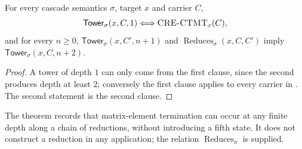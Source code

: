 \begin{theorem}\label{thm:ctmt-recursion}
For every cascade semantics \(\sigma\), target \(x\) and carrier \(C\),
\[
  \mathsf{Tower}_{\sigma}(x,C,1)\Longleftrightarrow\mbox{\textup{\textsc{CRE-CTMT}}}_{x}(C),
\]
and for every \(n\ge0\), \(\mathsf{Tower}_{\sigma}(x,C',n+1)\) and
\(\operatorname{Reduces}_{\sigma}(x,C,C')\) imply
\(\mathsf{Tower}_{\sigma}(x,C,n+2)\).
\end{theorem}

\begin{proof}
A tower of depth \(1\) can only come from the first clause, since the
second produces depth at least \(2\); conversely the first clause
applies to every carrier in \CRECTMT.  The second statement is the
second clause.
\end{proof}

The theorem records that matrix-element termination can occur at any
finite depth along a chain of reductions, without introducing a fifth
state.  It does not construct a reduction in any application; the
relation \(\operatorname{Reduces}_{\sigma}\) is supplied.


